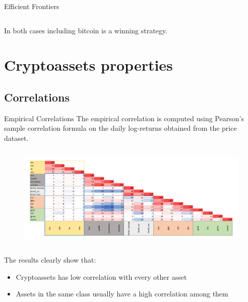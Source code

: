 \documentclass[aspectratio=169]{beamer}
\begin{document}
\begin{frame}{Efficient Frontiers}
\begin{columns}
\begin{column}{0.34\textwidth}
		\end{column}
	\end{columns}
	In both cases including bitcoin is a winning strategy.
\end{frame}

\section{Cryptoassets properties}

\subsection{Correlations}
\begin{frame}{Empirical Correlations}
	The empirical correlation is computed using Pearson's sample correlation formula on the daily log-returns obtained from the price dataset.
	\begin{figure}
		\centering
		\includegraphics[width=14cm, height=5cm, trim=4 4 4 4,clip]{Images/empcorr}
	\end{figure}
	The results clearly show that:
	\begin{itemize}
		\item Cryptoassets has low correlation with every other asset
		\item Assets in the same class usually have a high correlation among them
	\end{itemize}
\end{frame}
\end{document}
